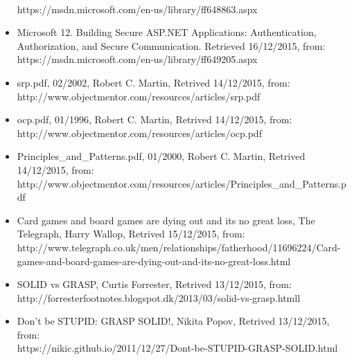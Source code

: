 \begin{itemize}
	\\
	 https://msdn.microsoft.com/en-us/library/ff648863.aspx
	\item Microsoft 12. Building Secure ASP.NET Applications: Authentication, Authorization, and Secure Communication. Retrieved 16/12/2015, from:
	\\
	 https://msdn.microsoft.com/en-us/library/ff649205.aspx
 	\item srp.pdf, 02/2002, Robert C. Martin, Retrived 14/12/2015, from:  
	\\
	 http://www.objectmentor.com/resources/articles/srp.pdf
 	\item ocp.pdf, 01/1996, Robert C. Martin, Retrived 14/12/2015, from:  
	\\
	http://www.objectmentor.com/resources/articles/ocp.pdf
 	\item Principles\_and\_Patterns.pdf, 01/2000, Robert C. Martin, Retrived 14/12/2015, from:
	\\
	 http://www.objectmentor.com/resources/articles/Principles\_and\_Patterns.pdf
	\item Card games and board games are dying out and its no great loss, The Telegraph, Harry Wallop, Retrived 15/12/2015, from:
	\\
	http://www.telegraph.co.uk/men/relationships/fatherhood/11696224/Card-games-and-board-games-are-dying-out-and-its-no-great-loss.html
	\item SOLID vs GRASP, Curtis Forrester, Retrived 13/12/2015, from:
	\\
	http://forresterfootnotes.blogspot.dk/2013/03/solid-vs-grasp.htmll
	\item Don't be STUPID: GRASP SOLID!, Nikita Popov, Retrived 13/12/2015, from:
	\\
	https://nikic.github.io/2011/12/27/Dont-be-STUPID-GRASP-SOLID.html
\end{itemize}
